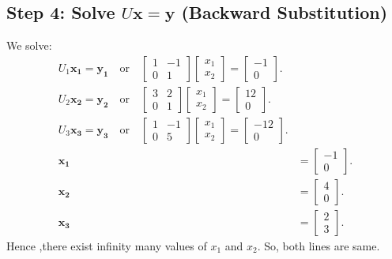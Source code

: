 \documentclass[journal]{IEEEtran}
\numberwithin{equation}{enumi}
\numberwithin{figure}{enumi}
\begin{document}
\begin{enumerate}
	\subsection*{Step 4: Solve $U\mathbf{x} = \mathbf{y}$ (Backward Substitution)}
	We solve:
	\begin{align}
		U_1\mathbf{x_1} = \mathbf{y_1} \quad \text{or} \quad \begin{bmatrix} 1 & -1 \\ 0 & 1 \end{bmatrix} \begin{bmatrix} x_1 \\ x_2 \end{bmatrix} = \begin{bmatrix} -1 \\ 0 \end{bmatrix}.\\
        U_2\mathbf{x_2} = \mathbf{y_2} \quad \text{or} \quad \begin{bmatrix} 3 & 2 \\ 0 & 1 \end{bmatrix} \begin{bmatrix} x_1 \\ x_2 \end{bmatrix} = \begin{bmatrix} 12 \\ 0 \end{bmatrix}.\\
        U_3\mathbf{x_3} = \mathbf{y_3} \quad \text{or} \quad \begin{bmatrix} 1 & -1 \\ 0 & 5 \end{bmatrix} \begin{bmatrix} x_1 \\ x_2 \end{bmatrix} = \begin{bmatrix} -12 \\ 0 \end{bmatrix}.\\
	    \mathbf{x_1} &= \begin{bmatrix} -1 \\ 0 \end{bmatrix}.\\
        \mathbf{x_2} &= \begin{bmatrix} 4 \\ 0 \end{bmatrix}.\\
        \mathbf{x_3} &= \begin{bmatrix} 2 \\ 3 \end{bmatrix}.
	\end{align}
	Hence ,there exist infinity many values of $x_1$ and $x_2$.
	So, both lines are same.
\end{enumerate}
\end{document}
